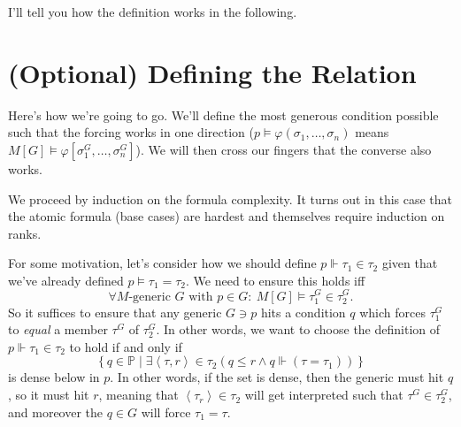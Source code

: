 \documentclass[11pt]{scrreprt}
\newcommand{\Po}{\mathbb P}
\begin{document}
I'll tell you how the definition works in the following.

\section{(Optional) Defining the Relation}
Here's how we're going to go.
We'll define the most generous condition possible such that
the forcing works in one direction ($p \vDash \varphi(\sigma_1, \dots, \sigma_n)$ means
$M[G] \vDash \varphi[\sigma_1^G, \dots, \sigma_n^G]$).
We will then cross our fingers that the converse also works.

We proceed by induction on the formula complexity.
It turns out in this case that the atomic formula (base cases)
are hardest and themselves require induction on ranks.

For some motivation, let's consider how we should define $p \Vdash \tau_1 \in \tau_2$ given that we've already defined $p \vDash \tau_1 = \tau_2$.
We need to ensure this holds iff
\[ \forall \text{$M$-generic $G$ with $p \in G$}:
	\ M[G] \vDash \tau_1^G \in \tau_2^G. \]
So it suffices to ensure that any generic $G \ni p$ hits a condition $q$ which forces $\tau_1^G$ to \emph{equal} a member $\tau^G$ of $\tau_2^G$.
In other words, we want to choose the definition of $p \Vdash \tau_1 \in \tau_2$ to hold if and only if
\[
	\left\{ q \in \Po
	\mid \exists \left<\tau, r\right> \in \tau_2 
	\left( q \le r \land q \Vdash(\tau=\tau_1) \right)
	\right\}
\]
is dense below in $p$.
In other words, if the set is dense, then the generic must hit $q$, so it must hit $r$, meaning that $\left<\tau_r\right> \in \tau_2$ will get interpreted such that $\tau^G \in \tau_2^G$, and moreover the $q \in G$ will force $\tau_1 = \tau$.
\end{document}
